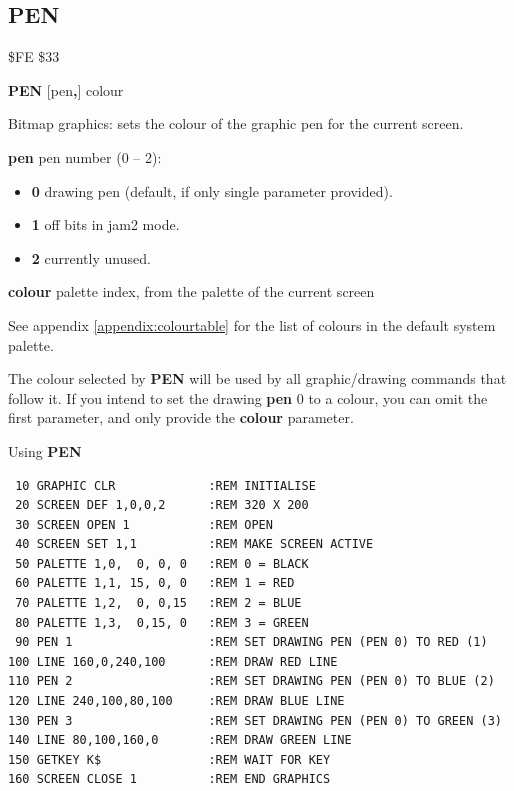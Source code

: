 \subsection{PEN}
\begin{description}[leftmargin=2cm,style=nextline]
\item [Token:] \$FE \$33
\item [Format:] {\bf PEN} [pen{\bf,}] colour
\item [Usage:]  Bitmap graphics: sets the colour of the graphic pen for the current screen.

                {\bf pen} pen number (0 -- 2):
                \begin{itemize}
                    \item {\bf 0} drawing pen (default, if only single parameter provided).
                    \item {\bf 1} off bits in jam2 mode.
                    \item {\bf 2} currently unused.
                \end{itemize}

                {\bf colour} palette index, from the palette of the current screen

                See appendix \vref{appendix:colourtable}
                for the list of colours in the default system palette.

\item [Remarks:] The colour selected by {\bf PEN} will be used by all
                 graphic/drawing commands that follow it.
                 If you intend to set the drawing {\bf pen} 0 to a colour, you can
                 omit the first parameter, and only provide the {\bf colour} parameter.

\item [Example:] Using {\bf PEN}

\begin{tcolorbox}[colback=black,coltext=white]
\verbatimfont{\codefont}
\begin{verbatim}
 10 GRAPHIC CLR             :REM INITIALISE
 20 SCREEN DEF 1,0,0,2      :REM 320 X 200
 30 SCREEN OPEN 1           :REM OPEN
 40 SCREEN SET 1,1          :REM MAKE SCREEN ACTIVE
 50 PALETTE 1,0,  0, 0, 0   :REM 0 = BLACK
 60 PALETTE 1,1, 15, 0, 0   :REM 1 = RED
 70 PALETTE 1,2,  0, 0,15   :REM 2 = BLUE
 80 PALETTE 1,3,  0,15, 0   :REM 3 = GREEN
 90 PEN 1                   :REM SET DRAWING PEN (PEN 0) TO RED (1)
100 LINE 160,0,240,100      :REM DRAW RED LINE
110 PEN 2                   :REM SET DRAWING PEN (PEN 0) TO BLUE (2)
120 LINE 240,100,80,100     :REM DRAW BLUE LINE
130 PEN 3                   :REM SET DRAWING PEN (PEN 0) TO GREEN (3)
140 LINE 80,100,160,0       :REM DRAW GREEN LINE
150 GETKEY K$               :REM WAIT FOR KEY
160 SCREEN CLOSE 1          :REM END GRAPHICS
\end{verbatim}
\end{tcolorbox}
\end{description}


